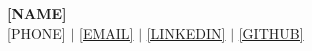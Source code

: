\documentclass[letterpaper,10pt]{article}
\begin{document}
\begin{center}
    \textbf{\Huge \scshape [NAME]} \\ \vspace{1pt}
    \small [PHONE] $|$ \href{mailto:[EMAIL]}{[EMAIL]} $|$ 
    \href{[LINKEDIN_URL]}{[LINKEDIN]} $|$
    \href{[GITHUB_URL]}{[GITHUB]}
\end{center}

\end{document}
